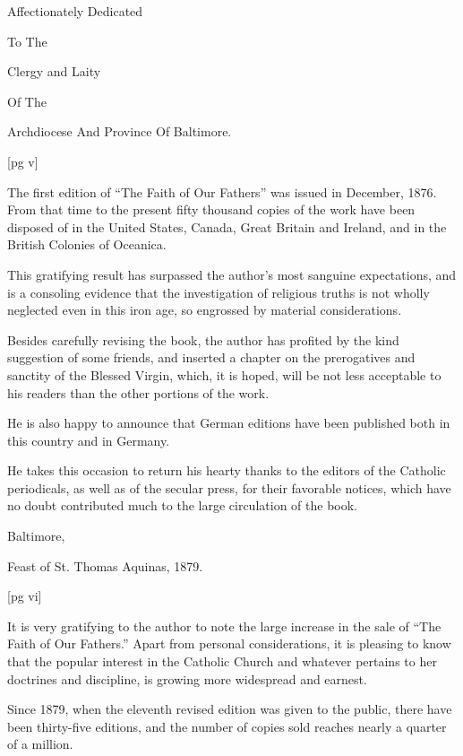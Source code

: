 
Affectionately Dedicated

To The

Clergy and Laity

Of The

Archdiocese And Province Of Baltimore.

[pg v]


The first edition of “The Faith of Our Fathers”
was issued in December, 1876. From that time to
the present fifty thousand copies of the work have
been disposed of in the United States, Canada,
Great Britain and Ireland, and in the British
Colonies of Oceanica.

This gratifying result has surpassed the author's
most sanguine expectations, and is a consoling
evidence that the investigation of religious
truths is not wholly neglected even in this iron
age, so engrossed by material considerations.

Besides carefully revising the book, the author
has profited by the kind suggestion of some
friends, and inserted a chapter on the prerogatives
and sanctity of the Blessed Virgin, which, it is
hoped, will be not less acceptable to his readers
than the other portions of the work.

He is also happy to announce that German editions
have been published both in this country and
in Germany.

He takes this occasion to return his hearty
thanks to the editors of the Catholic periodicals, as
well as of the secular press, for their favorable
notices, which have no doubt contributed much to
the large circulation of the book.

Baltimore,

Feast of St. Thomas Aquinas, 1879.

[pg vi]


It is very gratifying to the author to note the
large increase in the sale of “The Faith of Our
Fathers.” Apart from personal considerations,
it is pleasing to know that the popular interest in
the Catholic Church and whatever pertains to her
doctrines and discipline, is growing more widespread
and earnest.

Since 1879, when the eleventh revised edition
was given to the public, there have been thirty-five
editions, and the number of copies sold reaches
nearly a quarter of a million.

